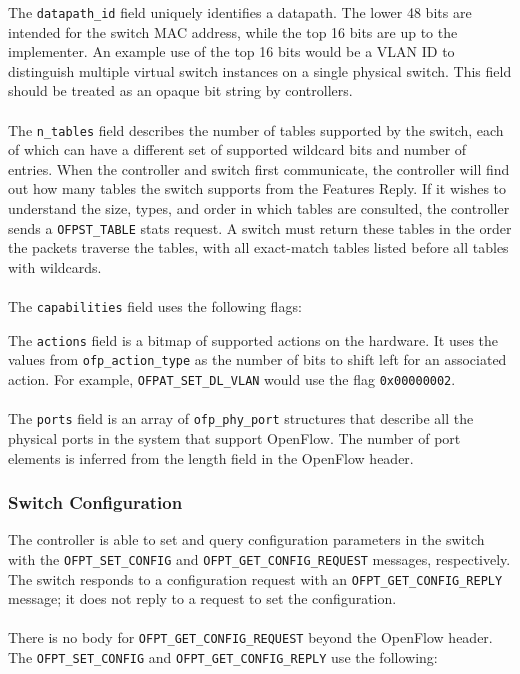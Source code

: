 
The \verb|datapath_id| field uniquely identifies a datapath.  The lower 48 bits are intended for the switch MAC address, while the top 16 bits are up to the implementer.  An example use of the top 16 bits would be a VLAN ID to distinguish multiple virtual switch instances on a single physical switch.  This field should be treated as an opaque bit string by controllers.
\\\\
The \verb|n_tables| field describes the number of tables supported by the switch, each of which can have a different set of supported wildcard bits and number of entries.  When the controller and switch first communicate, the controller will find out how many tables the switch supports from the Features Reply. If it wishes to understand the size, types, and order in which tables are consulted, the controller sends a \verb|OFPST_TABLE| stats request. A switch must return these tables in the order the packets traverse the tables, with all exact-match tables listed before all tables with wildcards.
\\\\
The \verb|capabilities| field uses the following flags:

 
The \verb|actions| field is a bitmap of supported actions on the hardware.  It uses the values from \verb|ofp_action_type| as the number of bits to shift left for an associated action.  For example, \verb|OFPAT_SET_DL_VLAN| would use the flag \verb|0x00000002|.
\\\\
The \verb|ports| field is an array of \verb|ofp_phy_port| structures that describe all the physical ports in the system that support OpenFlow.  The number of port elements is inferred from the length field in the OpenFlow header. 

\subsubsection{Switch Configuration}
The controller is able to set and query configuration parameters in the switch with the \verb|OFPT_SET_CONFIG| and \verb|OFPT_GET_CONFIG_REQUEST| messages, respectively.  The switch responds to a configuration request with an \verb|OFPT_GET_CONFIG_REPLY| message; it does not reply to a request to set the configuration.  
\\\\
There is no body for \verb|OFPT_GET_CONFIG_REQUEST| beyond the OpenFlow header.  The \verb|OFPT_SET_CONFIG| and \verb|OFPT_GET_CONFIG_REPLY| use the following:


